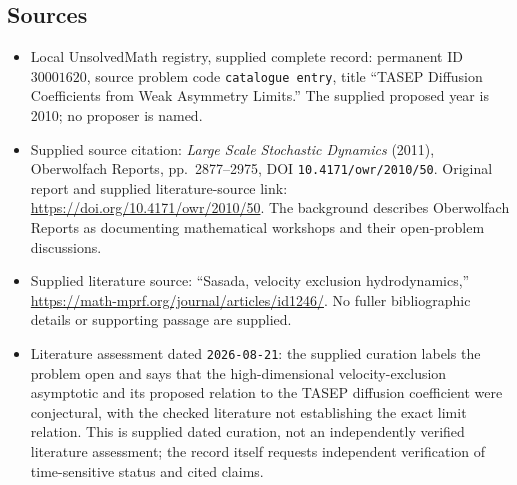 \documentclass[11pt]{article}
\begin{document}
\subsection{Sources}
\begin{itemize}
\item Local UnsolvedMath registry, supplied complete record: permanent ID \(30001620\), source problem code \texttt{catalogue entry}, title ``TASEP Diffusion Coefficients from Weak Asymmetry Limits.'' The supplied proposed year is 2010; no proposer is named.
\item Supplied source citation: \emph{Large Scale Stochastic Dynamics} (2011), Oberwolfach Reports, pp.~2877--2975, DOI \texttt{10.4171/owr/2010/50}. Original report and supplied literature-source link: \url{https://doi.org/10.4171/owr/2010/50}. The background describes Oberwolfach Reports as documenting mathematical workshops and their open-problem discussions.
\item Supplied literature source: ``Sasada, velocity exclusion hydrodynamics,'' \url{https://math-mprf.org/journal/articles/id1246/}. No fuller bibliographic details or supporting passage are supplied.
\item Literature assessment dated \texttt{2026-08-21}: the supplied curation labels the problem open and says that the high-dimensional velocity-exclusion asymptotic and its proposed relation to the TASEP diffusion coefficient were conjectural, with the checked literature not establishing the exact limit relation. This is supplied dated curation, not an independently verified literature assessment; the record itself requests independent verification of time-sensitive status and cited claims.
\end{itemize}
\end{document}
